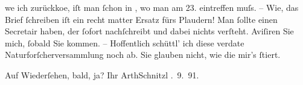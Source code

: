                   we{\geminationn} ich zurückko{\geminationm}e, iſt
                  {\pb}man{ }ſchon in \label{K_L02952-4v}\label{K_L02952-4}, wo man am 23. eintreffen muſs. – Wie, das
               Brief{ }ſchreiben iſt ein recht matter Ersatz fürs Plaudern! Man{ }ſollte einen Secretair
               haben, der{ }ſofort nachſchreibt und dabei nichts verſteht. Aviſiren Sie mich,{ }ſobald
               Sie kommen. – Hoffentlich schüttl’ ich diese verda{\geminationm}te
               Naturforſcherversammlung noch ab. Sie glauben nicht, wie die mir’s{ }ſtiert.\pend
           
\pstart
           {\pb}Auf Wiederſehen, bald, ja?\pend
           \pstart Ihr \spacefill\mbox{ArthSchnitzl}\pend{}
. 9. 91.\pend
           \endnumbering{}  \newcommand{\dateiname}{L02952}\newcommand{\titel}{Arthur Schnitzler an Felix Salten, 14. 9. 1891}\newcommand{\editorInnen}{Martin Anton Müller und Laura Untner}
